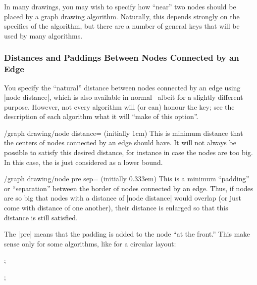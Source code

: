 \label{subsection-gd-dist-pad}

In many drawings, you may wish to specify how ``near'' two nodes should
be placed by a graph drawing algorithm. Naturally, this depends
strongly on the specifics of the algorithm, but there are a number of
general keys that will be used by many algorithms.


\subsubsection{Distances and Paddings Between Nodes Connected by an Edge}

You specify the ``natural'' distance between nodes
connected by an edge using |node distance|, which is also available in
normal \tikzname\ albeit for a slightly different purpose. However,
not every algorithm will (or can) honour the key; see the description
of each algorithm what it will ``make of this option''.

\begin{key}{/graph drawing/node distance= (initially 1cm)}
  This is minimum distance that the centers of nodes connected by an
  edge should have. It will not always be possible to satisfy this
  desired distance, for instance in case the nodes are too big. In
  this case, the  is just considered as a lower bound.
\begin{codeexample}[]
\end{codeexample}
\end{key}


\begin{key}{/graph drawing/node pre sep= (initially 0.333em)}
  This is a minimum ``padding'' or ``separation'' between the border
  of nodes connected by an edge. Thus, if nodes are so big that nodes
  with a distance of |node distance| would overlap (or
  just come with  distance of one another), their
  distance is enlarged so that this distance is still satisfied.

  The |pre| means that the padding is added to the node ``at the
  front.'' This make sense only for some algorithms, like for a
  circular layout:
  
\begin{codeexample}[]
\tikz {};
\end{codeexample}
\begin{codeexample}[]
\tikz {};  
\end{codeexample}
\end{key}

